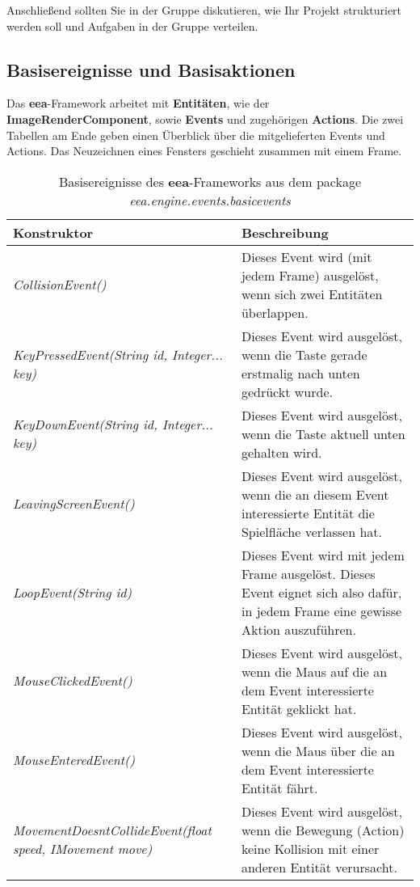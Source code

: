Anschließend sollten Sie in der Gruppe diskutieren, wie Ihr Projekt strukturiert werden soll und Aufgaben in der Gruppe verteilen.

\subsection {Basisereignisse und Basisaktionen}

Das \textbf{eea}-Framework arbeitet mit \textbf{Entit\"aten}, wie der \textbf{ImageRenderComponent}, sowie \textbf{Events} und
zugehörigen \textbf{Actions}. Die zwei Tabellen am Ende geben einen Überblick über die mitgelieferten Events und Actions.
Das Neuzeichnen eines Fensters geschieht zusammen mit einem Frame.

\begin{table}[htbp]
\begin{tabular}{|p{}|p{}|}\hline

\textbf{Konstruktor} & \textbf{Beschreibung}\\\hline\hline
\emph{CollisionEvent()} & Dieses Event wird (mit jedem Frame) ausgelöst, wenn sich zwei Entitäten überlappen.\\\hline
\emph{KeyPressedEvent(String id, Integer... key)} & Dieses Event wird ausgelöst, wenn die Taste gerade erstmalig nach unten gedrückt wurde.\\\hline
\emph{KeyDownEvent(String id, Integer... key)} & Dieses Event wird ausgelöst, wenn die Taste aktuell unten gehalten wird.\\\hline
\emph{LeavingScreenEvent()} & Dieses Event wird ausgelöst, wenn die an diesem Event interessierte Entität die Spielfl\"ache verlassen hat.\\\hline
\emph{LoopEvent(String id)} & Dieses Event wird mit jedem Frame ausgelöst. Dieses Event eignet sich also dafür, in jedem Frame eine gewisse Aktion auszuführen.\\\hline
\emph{MouseClickedEvent()} & Dieses Event wird ausgelöst, wenn die Maus auf die an dem Event interessierte Entität geklickt hat.\\\hline
\emph{MouseEnteredEvent()} & Dieses Event wird ausgelöst, wenn die Maus über die an dem Event interessierte Entität fährt.\\\hline
\emph{MovementDoesntCollideEvent(float speed, IMovement move)} & Dieses Event wird ausgelöst, wenn die Bewegung (Action) keine Kollision mit einer anderen Entität verursacht.\\\hline

\end{tabular}
\caption{Basisereignisse des \textbf{eea}-Frameworks aus dem package \emph{eea.engine.events.basicevents}}
\end{table}

